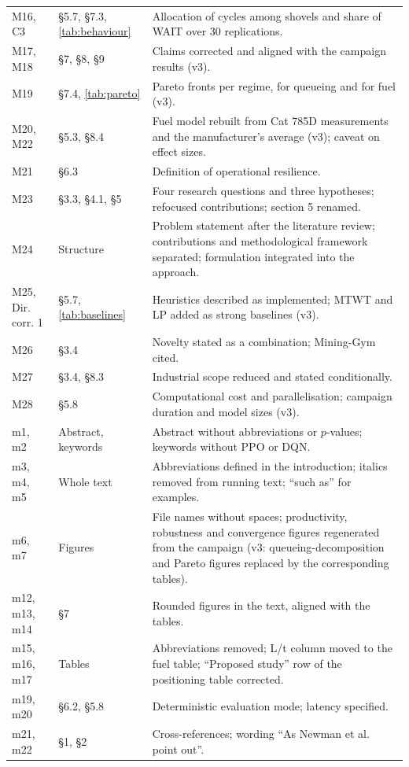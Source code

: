 \documentclass[11pt,a4paper]{article}
\begin{document}
\begin{longtable}{p{2.2cm}p{4.3cm}p{8.6cm}}
M16, C3 & §5.7, §7.3, \cref{tab:behaviour} & Allocation of cycles among shovels and share of WAIT over 30 replications. \\
M17, M18 & §7, §8, §9 & Claims corrected and aligned with the campaign results (v3). \\
M19 & §7.4, \cref{tab:pareto} & Pareto fronts per regime, for queueing and for fuel (v3). \\
M20, M22 & §5.3, §8.4 & Fuel model rebuilt from Cat 785D measurements and the manufacturer's average (v3); caveat on effect sizes. \\
M21 & §6.3 & Definition of operational resilience. \\
M23 & §3.3, §4.1, §5 & Four research questions and three hypotheses; refocused contributions; section 5 renamed. \\
M24 & Structure & Problem statement after the literature review; contributions and methodological framework separated; formulation integrated into the approach. \\
M25, Dir. corr. 1 & §5.7, \cref{tab:baselines} & Heuristics described as implemented; MTWT and LP added as strong baselines (v3). \\
M26 & §3.4 & Novelty stated as a combination; Mining-Gym cited. \\
M27 & §3.4, §8.3 & Industrial scope reduced and stated conditionally. \\
M28 & §5.8 & Computational cost and parallelisation; campaign duration and model sizes (v3). \\
m1, m2 & Abstract, keywords & Abstract without abbreviations or $p$-values; keywords without PPO or DQN. \\
m3, m4, m5 & Whole text & Abbreviations defined in the introduction; italics removed from running text; ``such as'' for examples. \\
m6, m7 & Figures & File names without spaces; productivity, robustness and convergence figures regenerated from the campaign (v3: queueing-decomposition and Pareto figures replaced by the corresponding tables). \\
m12, m13, m14 & §7 & Rounded figures in the text, aligned with the tables. \\
m15, m16, m17 & Tables & Abbreviations removed; L/t column moved to the fuel table; ``Proposed study'' row of the positioning table corrected. \\
m19, m20 & §6.2, §5.8 & Deterministic evaluation mode; latency specified. \\
m21, m22 & §1, §2 & Cross-references; wording ``As Newman et al. point out''. \\

\end{longtable}
\end{document}
